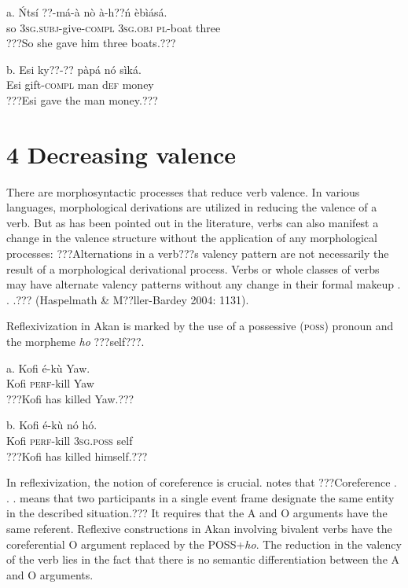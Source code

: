 \documentclass[output=paper]{langsci/langscibook}
\begin{document}
\ea
\gll a.  \'{N}tsí  ??{}-má-à      nò    à-h??ń    èbìásá.  \\
       so  \textsc{3sg.subj}{}-give-\textsc{compl}  \textsc{3sg.obj}  \textsc{pl}{}-boat    three\\
\glt ???So she gave him three boats.??? \citep[8]{Martin1936}
\z

\ea
\gll  b.  Esi  ky??-??    pàpá  nó   sìká.\\
       Esi  gift-\textsc{compl}  man  d\textsc{ef}  money\\
\glt   ???Esi gave the man money.???
\z

\section[4   Decreasing valence ]{4   Decreasing valence }

There are morphosyntactic processes that reduce verb valence. In various languages, morphological derivations are utilized in reducing the valence of a verb. But as has been pointed out in the literature, verbs can also manifest a change in the valence structure without the application of any morphological processes: ???Alternations in a verb???s valency pattern are not necessarily the result of a morphological derivational process. Verbs or whole classes of verbs may have alternate valency patterns without any change in their formal makeup . . .??? (Haspelmath \& M??ller-Bardey 2004: 1131).


Reflexivization in Akan is marked by the use of a possessive (\textsc{poss}) pronoun and the morpheme \emph{ho} ???self???.


\ea
\gll a.  Kofi  é-k\`{u}    Yaw.\\
       Kofi  \textsc{perf}{}-kill  Yaw\\
\glt ???Kofi has killed Yaw.???
\z

\ea
\gll  b.  Kofi    é-k\`{u}    nó    hó.\\
       Kofi    \textsc{perf}{}-kill  \textsc{3sg.poss}  self\\
\glt ???Kofi has killed himself.???
\z

In reflexivization, the notion of coreference is crucial. \citet[44]{Kemmer1993} notes that ???Coreference . . .  means that two participants in a single event frame designate the same entity in the described situation.???  It requires that the A and O arguments have the same referent. Reflexive constructions in Akan involving bivalent verbs have the coreferential O argument replaced by the POSS+\emph{ho}.  The reduction in the valency of the verb lies in the fact that there is no semantic differentiation between the A and O arguments. 
\end{document}

